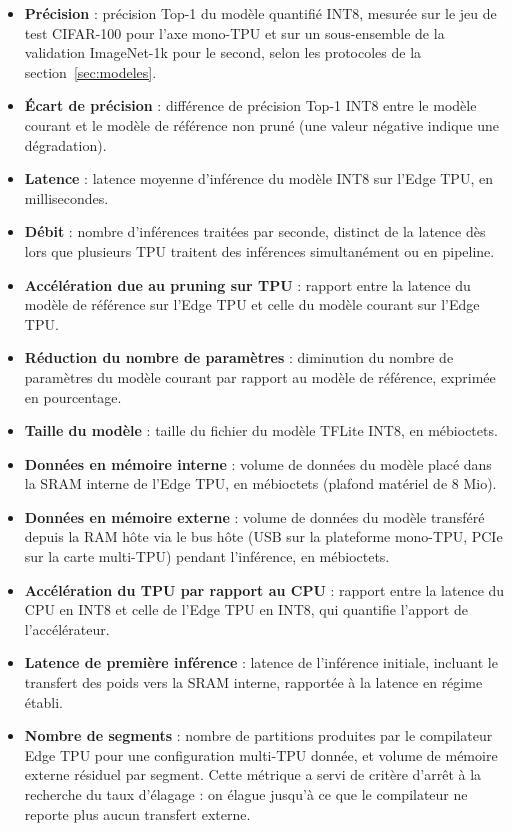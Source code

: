 \documentclass[11pt,a4paper]{report}
\begin{document}
\begin{itemize}
  \item \textbf{Précision} : précision Top-1 du modèle quantifié INT8, mesurée sur le jeu de test CIFAR-100 pour l'axe mono-TPU et sur un sous-ensemble de la validation ImageNet-1k pour le second, selon les protocoles de la section~\ref{sec:modeles}.
  \item \textbf{Écart de précision} : différence de précision Top-1 INT8 entre le modèle courant et le modèle de référence non pruné (une valeur négative indique une dégradation).
  \item \textbf{Latence} : latence moyenne d'inférence du modèle INT8 sur l'Edge TPU, en millisecondes.
  \item \textbf{Débit} : nombre d'inférences traitées par seconde, distinct de la latence dès lors que plusieurs TPU traitent des inférences simultanément ou en pipeline.
  \item \textbf{Accélération due au pruning sur TPU} : rapport entre la latence du modèle de référence sur l'Edge TPU et celle du modèle courant sur l'Edge TPU.
  \item \textbf{Réduction du nombre de paramètres} : diminution du nombre de paramètres du modèle courant par rapport au modèle de référence, exprimée en pourcentage.
  \item \textbf{Taille du modèle} : taille du fichier du modèle TFLite INT8, en mébioctets.
  \item \textbf{Données en mémoire interne} : volume de données du modèle placé dans la SRAM interne de l'Edge TPU, en mébioctets (plafond matériel de 8 Mio).
  \item \textbf{Données en mémoire externe} : volume de données du modèle transféré depuis la RAM hôte via le bus hôte (USB sur la plateforme mono-TPU, PCIe sur la carte multi-TPU) pendant l'inférence, en mébioctets.
  \item \textbf{Accélération du TPU par rapport au CPU} : rapport entre la latence du CPU en INT8 et celle de l'Edge TPU en INT8, qui quantifie l'apport de l'accélérateur.
  \item \textbf{Latence de première inférence} : latence de l'inférence initiale, incluant le transfert des poids vers la SRAM interne, rapportée à la latence en régime établi.
  \item \textbf{Nombre de segments} : nombre de partitions produites par le compilateur Edge TPU pour une configuration multi-TPU donnée, et volume de mémoire externe résiduel par segment. Cette métrique a servi de critère d'arrêt à la recherche du taux d'élagage : on élague jusqu'à ce que le compilateur ne reporte plus aucun transfert externe.
\end{itemize}
\end{document}
